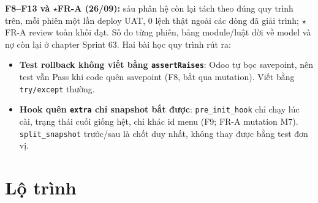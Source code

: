 \textbf{F8--F13 và $\star$FR-A (26/09):} sáu phân hệ còn lại tách theo đúng quy trình trên, mỗi phiên một
lần deploy UAT, 0 lệch thật ngoài các dòng đã giải trình; $\star$FR-A review toàn khối đạt. Số đo từng phiên, bảng
module/luật dời về model và nợ còn lại ở chapter Sprint 63. Hai bài học quy trình rút ra:
\begin{itemize}[nosep]
\item \textbf{Test rollback không viết bằng \texttt{assertRaises}}: Odoo tự bọc savepoint, nên test vẫn Pass
  khi code quên savepoint (F8, bắt qua mutation). Viết bằng \texttt{try/except} thường.
\item \textbf{Hook quên \texttt{extra} chỉ snapshot bắt được}: \texttt{pre\_init\_hook} chỉ chạy lúc cài, trạng thái
  cuối giống hệt, chỉ khác id menu (F9; FR-A mutation M7). \texttt{split\_snapshot} trước/sau là chốt duy nhất,
  không thay được bằng test đơn vị.
\end{itemize}

\section{Lộ trình}

